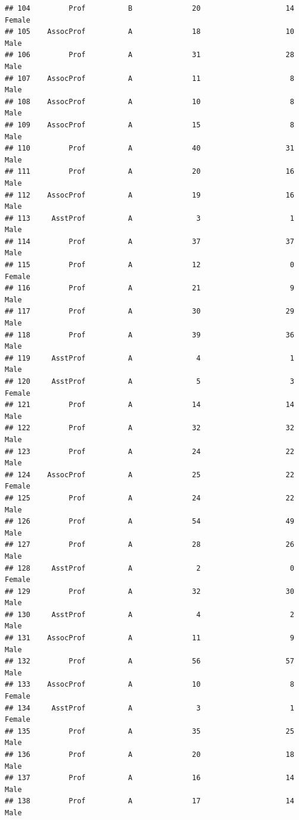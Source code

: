 \documentclass[]{article}
\begin{document}
\begin{verbatim}
## 104         Prof          B              20                    14 Female
## 105    AssocProf          A              18                    10   Male
## 106         Prof          A              31                    28   Male
## 107    AssocProf          A              11                     8   Male
## 108    AssocProf          A              10                     8   Male
## 109    AssocProf          A              15                     8   Male
## 110         Prof          A              40                    31   Male
## 111         Prof          A              20                    16   Male
## 112    AssocProf          A              19                    16   Male
## 113     AsstProf          A               3                     1   Male
## 114         Prof          A              37                    37   Male
## 115         Prof          A              12                     0 Female
## 116         Prof          A              21                     9   Male
## 117         Prof          A              30                    29   Male
## 118         Prof          A              39                    36   Male
## 119     AsstProf          A               4                     1   Male
## 120     AsstProf          A               5                     3 Female
## 121         Prof          A              14                    14   Male
## 122         Prof          A              32                    32   Male
## 123         Prof          A              24                    22   Male
## 124    AssocProf          A              25                    22 Female
## 125         Prof          A              24                    22   Male
## 126         Prof          A              54                    49   Male
## 127         Prof          A              28                    26   Male
## 128     AsstProf          A               2                     0 Female
## 129         Prof          A              32                    30   Male
## 130     AsstProf          A               4                     2   Male
## 131    AssocProf          A              11                     9   Male
## 132         Prof          A              56                    57   Male
## 133    AssocProf          A              10                     8 Female
## 134     AsstProf          A               3                     1 Female
## 135         Prof          A              35                    25   Male
## 136         Prof          A              20                    18   Male
## 137         Prof          A              16                    14   Male
## 138         Prof          A              17                    14   Male

\end{verbatim}
\end{document}
